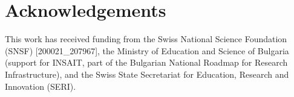\section*{Acknowledgements}
This work has received funding from the Swiss National Science Foundation (SNSF) [200021\_207967], the Ministry of Education and Science of Bulgaria (support for INSAIT, part of the Bulgarian National Roadmap for Research Infrastructure), and the Swiss State Secretariat for Education, Research and Innovation (SERI).
